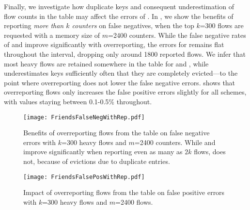  Finally, we investigate how
duplicate keys and consequent underestimation of flow counts in the table may
affect the errors of \TheSystem. In , we show
the benefits of reporting {\em more than $k$ counters} on false negatives, when
the top $k$=300 flows are requested with a memory size of $m$=2400 counters.
While the false negative rates of \spacesaving and \Baseline improve
significantly with overreporting, the errors for \TheSystem remains flat
throughout the interval, dropping only around 1800 reported flows. We infer that
most heavy flows are retained somewhere in the table for \spacesaving and
\Baseline, while \TheSystem underestimates keys sufficiently often that they are
completely evicted---to the point where overreporting does not lower the false
negative errors.  shows that overreporting
flows only increases the false positive errors slightly for all schemes, with
values staying between 0.1-0.5\% throughout.

\begin{figure}[h]
\texttt{[image: FriendsFalseNegWithRep.pdf]}
\caption{Benefits of overreporting flows from the table on false negative errors
  with $k$=300 heavy flows and $m$=2400 counters. While \spacesaving and
  \Baseline improve significantly when reporting even as many as $2k$ flows,
  \TheSystem does not, because of evictions due to duplicate entries.}
\label{fig:reportingMoreThanK-falseneg}
\end{figure}

\begin{figure}[h]
\texttt{[image: FriendsFalsePosWithRep.pdf]}
\caption{Impact of overreporting flows from the table on false positive errors
  with $k$=300 heavy flows and $m$=2400 flows. %
  }
\label{fig:reportingMoreThanK-falsepos}
\end{figure}





